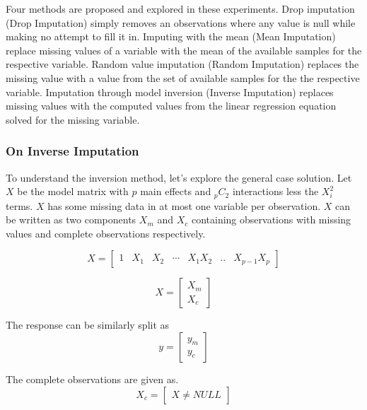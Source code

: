 \documentclass[../../paper.tex]{subfiles}
\begin{document}
Four methods are proposed and explored in these experiments. Drop imputation (Drop Imputation) simply removes an observations where any value is null while making no attempt to fill it in.
Imputing with the mean (Mean Imputation) replace missing values of a variable with the mean of the available samples for the respective variable.
Random value imputation (Random Imputation) replaces the missing value with a value from the set of available samples for the the respective variable. Imputation through model inversion (Inverse Imputation) replaces missing values with the computed values from the linear regression equation solved for the missing variable.

\subsubsection*{On Inverse Imputation}
To understand the inversion method, let's explore the general case solution.
Let $X$ be the model matrix with $p$ main effects and ${}_{p}C_{2}$ interactions less the $X_{i}^2$ terms.
$X$ has some missing data in at most one variable per observation. $X$ can be
written as two components $X_{m}$ and $X_{c}$ containing observations with
 missing values and complete observations respectively.

\begin{equation}
  X = \begin{bmatrix}
  1 & X_{1} & X_{2} & \cdots & X_{1}X_{2} & .. &X_{p-1}X_{p}
\end{bmatrix}
\end{equation}


\begin{equation}
  X = \begin{bmatrix}
  X_{m} \\
  X_{c}
\end{bmatrix}
\end{equation}

The response can be similarly split as
\begin{equation}
  y = \begin{bmatrix}
  y_{m} \\
  y_{c}
\end{bmatrix}
\end{equation}


The complete observations are given as.
\begin{equation}
  X_{c} =
  \begin{bmatrix}
    X \neq NULL
  \end{bmatrix}
\end{equation}
\end{document}
